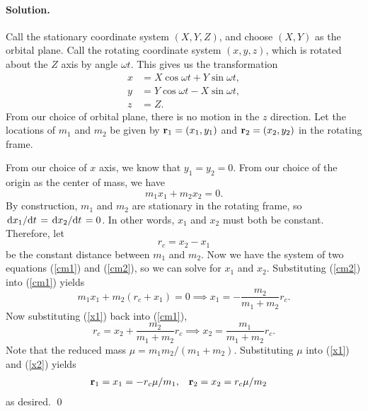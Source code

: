 \documentclass[11pt]{article}
\newcommand{\refeq}[1]{(\ref{#1})}
\newenvironment{solution}
{
    \paragraph{Solution.}
    \ignorespaces
}
{
    \bigskip
}
\begin{document}
\begin{solution}
	Call the stationary coordinate system $(X, Y, Z)$, and choose $(X, Y)$ as the orbital plane.  Call the rotating coordinate system $(x, y, z)$, which is rotated about the $Z$ axis by angle $\omega t$.  This gives us the transformation
	\begin{align}
		x &= X \cos{\omega t} + Y \sin{\omega t}, \label{oldx} \\
		y &= Y \cos{\omega t} - X \sin{\omega t},  \label{oldy} \\
		z &= Z.
	\end{align}
	From our choice of orbital plane, there is no motion in the $z$ direction.  Let the locations of $m_1$ and $m_2$ be given by $\mathbf{r}_1 = (x_1, y_1)$ and $\mathbf{r}_2 = (x_2, y_2)$ in the rotating frame.
	
	From our choice of $x$ axis, we know that $y_1 = y_2 = 0$.  From our choice of the origin as the center of mass, we have
	\begin{equation} \label{cm1}
		m_1 x_1 + m_2 x_2 = 0.
	\end{equation}
	By construction, $m_1$ and $m_2$ are stationary in the rotating frame, so $\dv*{x_1}{t} = \dv*{x_2}{t} = 0$.  In other words, $x_1$ and $x_2$ must both be constant.  Therefore, let
	\begin{equation} \label{cm2}
		r_c = x_2 - x_1
	\end{equation}
	be the constant distance between $m_1$ and $m_2$.  Now we have the system of two equations \refeq{cm1} and \refeq{cm2}, so we can solve for $x_1$ and $x_2$.  Substituting \refeq{cm2} into \refeq{cm1} yields
	\begin{equation} \label{x1}
		m_1 x_1 + m_2 (r_c + x_1) = 0 \implies x_1 = -\frac{m_2}{m_1 + m_2} r_c.
	\end{equation}
	Now substituting \refeq{x1} back into \refeq{cm1},
	\begin{equation} \label{x2}
		r_c = x_2 + \frac{m_2}{m_1 + m_2} r_c \implies x_2 = \frac{m_1}{m_1 + m_2} r_c.
	\end{equation}
	Note that the reduced mass $\mu = m_1 m_2 / (m_1 + m_2)$.  Substituting $\mu$ into \refeq{x1} and \refeq{x2} yields
	\begin{align} \label{result1a}
		\mathbf{r}_1 &= x_1 = - r_c \mu / m_1, & \mathbf{r}_2 &= x_2 = r_c \mu / m_2
	\end{align}
	as desired. \qed


\end{solution}

\newcommand{\xd}{\dot{x}}
\newcommand{\Xd}{\dot{X}}
\newcommand{\yd}{\dot{y}}
\newcommand{\Yd}{\dot{Y}}
\end{document}
